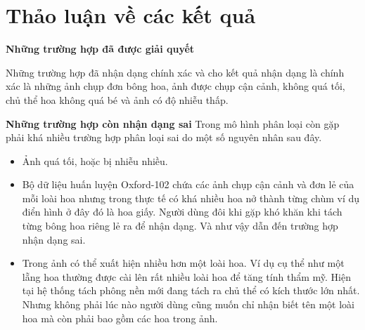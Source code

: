 \documentclass[12pt]{report}
\begin{document}
		\section{Thảo luận về các kết quả}
		
		\textbf{Những trường hợp đã được giải quyết}
		
		Những trường hợp đã nhận dạng chính xác và cho kết quả nhận dạng là chính xác là những ảnh chụp đơn bông hoa, ảnh được chụp cận cảnh, không quá tối, chủ thể hoa không quá bé và ảnh có độ nhiễu thấp.
		
		\textbf{Những trường hợp còn nhận dạng sai}
		Trong mô hình phân loại còn gặp phải khá nhiều trường hợp phân loại sai do một số nguyên nhân sau đây.
		\begin{itemize}
			\item Ảnh quá tối, hoặc bị nhiễu nhiều.
			\item Bộ dữ liệu huấn luyện Oxford-102 chứa các ảnh chụp cận cảnh và đơn lẻ của mỗi loài hoa nhưng trong thực tế có khá nhiều hoa nở thành từng chùm ví dụ điển hình ở đây đó là hoa giấy. Người dùng đôi khi gặp khó khăn khi tách từng bông hoa riêng lẻ ra để nhận dạng. Và như vậy dẫn đến trường hợp nhận dạng sai.
			\item Trong ảnh có thể xuất hiện nhiều hơn một loài hoa. Ví dụ cụ thể như một lẵng hoa thường được cài lên rất nhiều loài hoa để tăng tính thẩm mỹ. Hiện tại hệ thống tách phông nền mới đang tách ra chủ thể có kích thước lớn nhất. Nhưng không phải lúc nào người dùng cũng muốn chỉ nhận biết tên một loài hoa mà còn phải bao gồm các hoa trong ảnh.
		\end{itemize}
\end{document}
